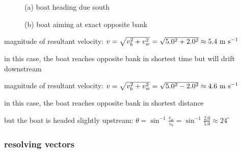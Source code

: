 \begin{figure}[ht]
	\centering
	\begin{minipage}[b]{0.45\textwidth}
		\centering
		
		\vspace*{20pt}
		
		(a) boat heading due south
	\end{minipage}
	\begin{minipage}[b]{0.45\textwidth}
		\centering
		
		(b) boat aiming at exact opposite bank
	\end{minipage}
\end{figure}

\begin{compactitem}
	\item[(a)] magnitude of resultant velocity: $v = \sqrt{v_b^2 + v_w^2} = \sqrt{5.0^2 +2.0^2} \approx 5.4 \text{ m s$^{-1}$}$
	
	in this case, the boat reaches opposite bank in shortest time but will drift downstream
	
	\item[(b)] magnitude of resultant velocity: $v = \sqrt{v_b^2 + v_w^2} = \sqrt{5.0^2 -2.0^2} \approx 4.6 \text{ m s$^{-1}$}$
	
	in this case, the boat reaches opposite bank in shortest distance
	
	but the boat is headed slightly upstream: $\theta = \sin^{-1} \frac{v_w}{v_b} = \sin^{-1}\frac{2.0}{5.0} \approx 24^\circ$ \eoe
\end{compactitem}



\subsubsection{resolving vectors}

